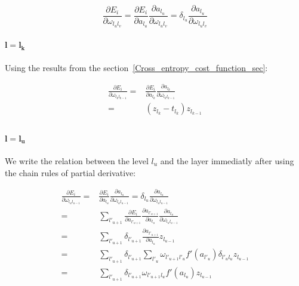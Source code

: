 \documentclass[final, paper=letter,5p,times,twocolumn]{elsarticle}
\begin{document}
\begin{equation*}
  \frac{\partial E_{i}}{\partial \omega_{l_{u}l_{v}}} = \frac{\partial E_{i}}{\partial a_{l_{u}}} \frac{\partial a_{l_{u}}}{\partial \omega_{l_{u}l_{v}}} = \delta_{l_{u}}\frac{\partial a_{l_{u}}}{\partial \omega_{l_{u}l_{v}}} 
\end{equation*}


\paragraph{$\bm{l = l_{k}}$}{ Using the results from the section~\ref{Cross_entropy_cost_function_sec}:

  \begin{equation*}
    \begin{split}
      \frac{\partial E_{i}}{\partial \omega_{l_{k}l_{k-1}}} = &  \frac{\partial E_{i}}{\partial a_{l_{k}}} \frac{\partial a_{l_{k}}}{\partial \omega_{l_{k}l_{k-1}}}  \\
              = &  (z_{l_{k}} - t_{l_{k}})z_{l_{k-1}} \\
    \end{split}
  \end{equation*}

}

\paragraph{$\bm{l = l_{u}}$}{We write the relation between the level $l_{u}$ and the layer immediatly after using the chain rules of partial derivative:

  \begin{equation*}
    \begin{split}
      \frac{\partial E_{i}}{\partial \omega_{l_{u}l_{u-1}}} = &  \frac{\partial E_{i}}{\partial a_{l_{u}}} \frac{\partial a_{l_{u}}}{\partial \omega_{l_{u}l_{u-1}}} = \delta_{l_{u}} \frac{\partial a_{l_{u}}}{\partial \omega_{l_{u}l_{u-1}}}  \\
              = & \sum_{l'_{u+1}}\frac{\partial E_{i}}{\partial a_{l'_{u+1}}} \frac{\partial a_{l'_{u+1}}}{\partial a_{l_{u}}} \frac{\partial a_{l_{u}}}{\partial \omega_{l_{u}l_{u-1}}}   \\
              = & \sum_{l'_{u+1}} \delta_{l'_{u+1}} \frac{\partial a_{l'_{u+1}}}{\partial a_{l_{u}}} z_{l_{u-1}}   \\
              = & \sum_{l'_{u+1}} \delta_{l'_{u+1}} \sum_{l'_{u}} \omega_{l'_{u+1}l'_{u}} f'(a_{l'_{u}}) \delta_{l'_{u}l_{u}} z_{l_{u-1}}   \\
              = & \sum_{l'_{u+1}} \delta_{l'_{u+1}} \omega_{l'_{u+1}l_{u}} f'(a_{l_{u}}) z_{l_{u-1}}   \\
    \end{split}
\end{equation*}

}
\end{document}
